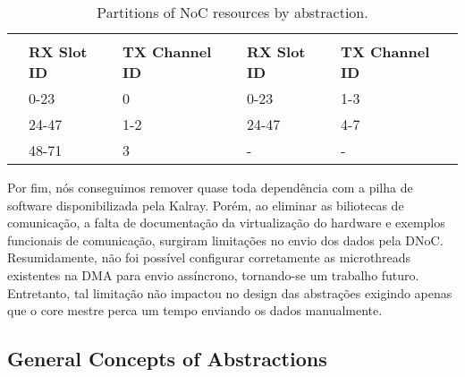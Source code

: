 			\begin{table}[!tb]
				\centering%
				\caption{Partitions of NoC resources by abstraction.}%
				\label{tab.noc-resources}%


				\begin{tabular}{l|l|l|l|l|}
					\cline{2-5}
															& \multicolumn{2}{c|}{\textbf{\cnoc}}          & \multicolumn{2}{c|}{\textbf{\dnoc}}          \\ \cline{2-5}
															& \textbf{RX Slot ID} & \textbf{TX Channel ID} & \textbf{RX Slot ID} & \textbf{TX Channel ID} \\ \hline
					\multicolumn{1}{|l|}{\textbf{\mailbox}} & 0-23                & 0                      & 0-23                & 1-3                    \\ \hline
					\multicolumn{1}{|l|}{\textbf{\portal}}  & 24-47               & 1-2                    & 24-47               & 4-7                    \\ \hline
					\multicolumn{1}{|l|}{\textbf{\sync}}    & 48-71               & 3                      & -                   & -                      \\ \hline
				\end{tabular}

			\end{table}

			Por fim, nós conseguimos remover quase toda dependência com a pilha de software disponibilizada pela Kalray.
			Porém, ao eliminar as biliotecas de comunicação, a falta de documentação da virtualização do hardware e exemplos funcionais de comunicação, surgiram limitações no envio dos dados pela DNoC.
			Resumidamente, não foi possível configurar corretamente as microthreads existentes na DMA para envio assíncrono, tornando-se um trabalho futuro.
			Entretanto, tal limitação não impactou no design das abstrações exigindo apenas que o core mestre perca um tempo enviando os dados manualmente.

		\subsection{General Concepts of Abstractions}
		\label{sec.general-concepts}

